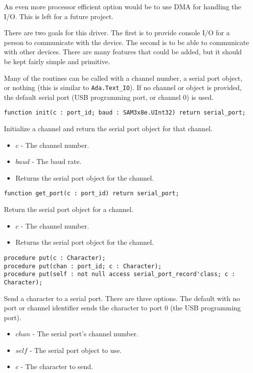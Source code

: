 \documentclass[10pt, openany]{book}
\newcommand{\indexfunc}[1]{\index[func]{#1}}
\newcommand{\package}[1]{\texttt{#1}}
\begin{document}
An even more processor efficient option would be to use DMA for handling the I/O.  This is left for a future project.

There are two goals for this driver.  The first is to provide console I/O for a person to communicate with the device.  The second is to be able to communicate with other devices.  There are many features that could be added, but it should be kept fairly simple and primitive.

Many of the routines can be called with a channel number, a serial port object, or nothing (this is similar to \package{Ada.Text\_IO}).  If no channel or object is provided, the default serial port (USB programming port, or channel 0) is used.

\begin{lstlisting}
function init(c : port_id; baud : SAM3x8e.UInt32) return serial_port;
\end{lstlisting}
\indexfunc{init}
Initialize a channel and return the serial port object for that channel.
\begin{itemize}
  \item $c$ - The channel number.
  \item $baud$ - The baud rate.
  \item Returns the serial port object for the channel.
\end{itemize}

\begin{lstlisting}
function get_port(c : port_id) return serial_port;
\end{lstlisting}
\indexfunc{get\_port}
Return the serial port object for a channel.
\begin{itemize}
  \item $c$ - The channel number.
  \item Returns the serial port object for the channel.
\end{itemize}

\begin{lstlisting}
procedure put(c : Character);
procedure put(chan : port_id; c : Character);
procedure put(self : not null access serial_port_record'class; c : Character);
\end{lstlisting}
\indexfunc{put}
Send a character to a serial port.  There are three options.  The default with no port or channel identifier sends the character to port 0 (the USB programming port).
\begin{itemize}
  \item $chan$ - The serial port's channel number.
  \item $self$ - The serial port object to use.
  \item $c$ - The character to send.
\end{itemize}
\end{document}
